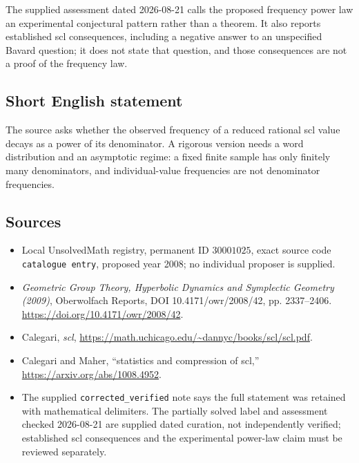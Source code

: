 \documentclass[11pt]{article}
\begin{document}
The supplied assessment dated 2026-08-21 calls the proposed frequency power law an experimental conjectural pattern rather than a theorem. It also reports established scl consequences, including a negative answer to an unspecified Bavard question; it does not state that question, and those consequences are not a proof of the frequency law.
\subsection{Short English statement}
The source asks whether the observed frequency of a reduced rational scl value decays as a power of its denominator. A rigorous version needs a word distribution and an asymptotic regime: a fixed finite sample has only finitely many denominators, and individual-value frequencies are not denominator frequencies.
\subsection{Sources}
\begin{itemize}
\item Local UnsolvedMath registry, permanent ID \(30001025\), exact source code \texttt{catalogue entry}, proposed year 2008; no individual proposer is supplied.
\item \emph{Geometric Group Theory, Hyperbolic Dynamics and Symplectic Geometry (2009)}, Oberwolfach Reports, DOI 10.4171/owr/2008/42, pp. 2337--2406. \url{https://doi.org/10.4171/owr/2008/42}.
\item Calegari, \emph{scl}, \url{https://math.uchicago.edu/~dannyc/books/scl/scl.pdf}.
\item Calegari and Maher, ``statistics and compression of scl,'' \url{https://arxiv.org/abs/1008.4952}.
\item The supplied \texttt{corrected\_verified} note says the full statement was retained with mathematical delimiters. The partially solved label and assessment checked 2026-08-21 are supplied dated curation, not independently verified; established scl consequences and the experimental power-law claim must be reviewed separately.
\end{itemize}
\end{document}
